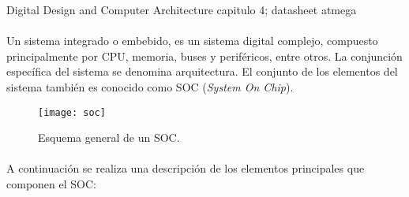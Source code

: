 Digital Design and Computer Architecture capitulo 4; datasheet atmega
\paragraph{}
Un sistema integrado o embebido, es un sistema digital complejo, compuesto principalmente por CPU, memoria, buses y perif\'ericos, entre otros. La conjunción específica del sistema se denomina arquitectura. El conjunto de los elementos del sistema tambi\'en es conocido como SOC (\textit{System On Chip}).
\begin{figure}[h]
    \centering
    \texttt{[image: soc]}
    \caption{Esquema general de un SOC.} 
    \label{fig:soc}
\end{figure}
\paragraph{}
A continuaci\'on se realiza una descripción de los elementos principales que componen el SOC:
